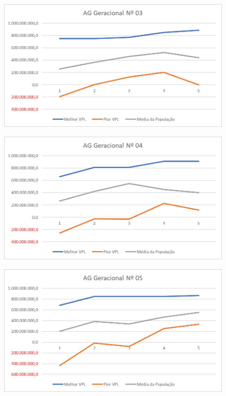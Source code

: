 \documentclass[12pt,a4paper]{report}
\begin{document}
\begin{figure}[H]
\centering

\includegraphics[scale=1]{AGG/3}

\end{figure}

\begin{figure}[H]
\centering

\includegraphics[scale=1]{AGG/4}

\end{figure}

\begin{figure}[H]
\centering

\includegraphics[scale=1]{AGG/5}

\end{figure}
\end{document}
